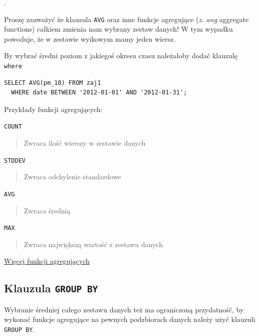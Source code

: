 \documentclass[a4paper]{article}
\begin{document}
.

Proszę zauważyć że klauzula \texttt{AVG} oraz inne funkcje agregujące
(\emph{z. ang} aggregate functions) całkiem zmienia nam wybrany zestaw danych!
W tym wypadku powoduje, że w zestawie wyikowym mamy jeden wiersz.

By wybrać średni poziom z jakiegoś okresu czasu należałoby
dodać klauzulę \texttt{where}

\begin{verbatim}
SELECT AVG(pm_10) FROM zaj1
  WHERE date BETWEEN '2012-01-01' AND '2012-01-31';
\end{verbatim}


Przykłady funkcji agregujących:

\texttt{COUNT}
%
\begin{quote}

Zwraca ilość wierszy w zestawie danych

\end{quote}

\texttt{STDDEV}
%
\begin{quote}

Zwraca odchylenie standardowe

\end{quote}

\texttt{AVG}
%
\begin{quote}

Zwraca średnią

\end{quote}

\texttt{MAX}
%
\begin{quote}

Zwraca największą wartość z zestawu danych

\end{quote}

\href{https://www.google.pl/?q=postgresql\%209.2\%20aggregate\%20functions}{Więcej funkcji agregujących}


\subsection{Klauzula \texttt{GROUP BY}%
  \label{klauzula-group-by}%
}

Wybranie średniej całego zestawu danych też ma ograniczoną
przydatność, by wykonać funkcje agregujące na pewnych podzbiorach
danych należy użyć klauzuli \texttt{GROUP BY}.
\end{document}
